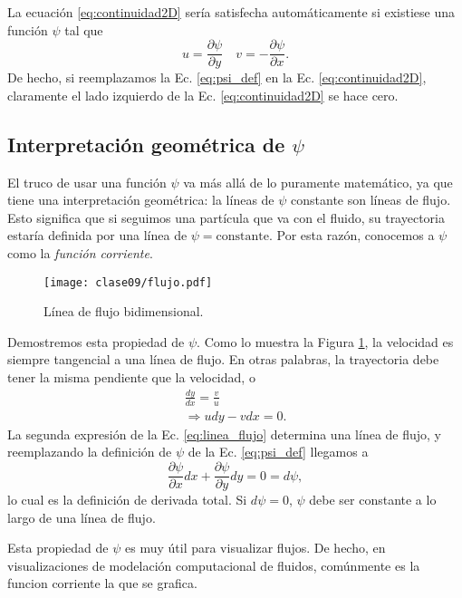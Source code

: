 La ecuación \eqref{eq:continuidad2D} sería satisfecha automáticamente si existiese una función $\psi$ tal que
%
\begin{equation} \label{eq:psi_def}
u = \frac{\partial \psi}{\partial y} \quad v = -\frac{\partial \psi}{\partial x}.
\end{equation}
%
De hecho, si reemplazamos la Ec. \eqref{eq:psi_def} en la Ec. \eqref{eq:continuidad2D}, claramente el lado izquierdo de la Ec. \eqref{eq:continuidad2D} se hace cero.

\subsection*{Interpretación geométrica de $\psi$}
El truco de usar una función $\psi$ va más allá de lo puramente matemático, ya que tiene una interpretación geométrica: la líneas de $\psi$ constante son líneas de flujo.
Esto significa que si seguimos una partícula que va con el fluido, su trayectoria estaría definida por una línea de $\psi =\text{constante}$.
Por esta razón, conocemos a $\psi$ como la \emph{función corriente}.

\begin{figure}[!h]
\centering
\texttt{[image: clase09/flujo.pdf]}
\caption{Línea de flujo bidimensional.}
\label{fig:flujo}
\end{figure}

Demostremos esta propiedad de $\psi$.
Como lo muestra la Figura \ref{fig:flujo}, la velocidad es siempre tangencial a una línea de flujo. 
En otras palabras, la trayectoria debe tener la misma pendiente que la velocidad, o
%
\begin{align}\label{eq:linea_flujo}
\frac{dy}{dx} = \frac{v}{u} \nonumber \\
\Rightarrow udy - vdx = 0.
\end{align}
%
La segunda expresión de la Ec. \eqref{eq:linea_flujo} determina una línea de flujo, y reemplazando la definición de $\psi$ de la Ec. \eqref{eq:psi_def} llegamos a
%
\begin{equation}
\frac{\partial\psi}{\partial x} dx + \frac{\partial \psi}{\partial y}dy = 0 = d\psi,
\end{equation}
%
lo cual es la definición de derivada total.
Si $d\psi=0$, $\psi$ debe ser constante a lo largo de una línea de flujo.

Esta propiedad de $\psi$ es muy útil para visualizar flujos.
De hecho, en visualizaciones de modelación computacional de fluidos, comúnmente es la funcion corriente la que se grafica.

